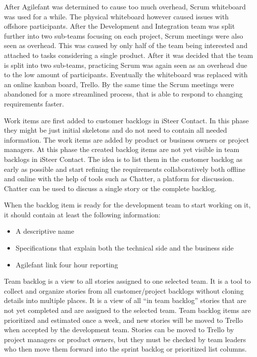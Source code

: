 \documentclass[english]{tktltiki2}
\theoremstyle{definition}
\theoremstyle{remark}
\begin{document}
After Agilefant was determined to cause too much overhead, Scrum whiteboard was used for a while. The physical whiteboard however caused issues with offshore participants. After the Development and Integration team was split further into two sub-teams focusing on each project, Scrum meetings were also seen as overhead. This was caused by only half of the team being interested and attached to tasks considering a single product. After it was decided that the team is split into two sub-teams, practicing Scrum was again seen as an overhead due to the low amount of participants. Eventually the whiteboard was replaced with an online kanban board, Trello. By the same time the Scrum meetings were abandoned for a more streamlined process, that is able to respond to changing requirements faster. 

Work items are first added to customer backlogs in iSteer Contact. In this phase they might be just initial skeletons and do not need to contain all needed information. The work items are added by product or business owners or project managers. At this phase the created backlog items are not yet visible in team backlogs in iSteer Contact. The idea is to list them in the customer backlog as early as possible and start refining the requirements collaboratively both offline and online with the help of tools such as Chatter, a platform for discussion. Chatter can be used to discuss a single story or the complete backlog.

When the backlog item is ready for the development team to start working on it, it should contain at least the following information:
\begin{itemize}
\item  A descriptive name
\item  Specifications that explain both the technical side and the business side
\item  Agilefant link four hour reporting
\end{itemize}

Team backlog is a view to all stories assigned to one selected team. It is a tool to collect and organize stories from all customer/project backlogs without cloning details into multiple places. It is a view of all “in team backlog” stories that are not yet completed and are assigned to the selected team. Team backlog items are prioritized and estimated once a week, and new stories will be moved to Trello when accepted by the development team. Stories can be moved to Trello by project managers or product owners, but they must be checked by team leaders who then move them forward into the sprint backlog or prioritized list columns.
\end{document}
